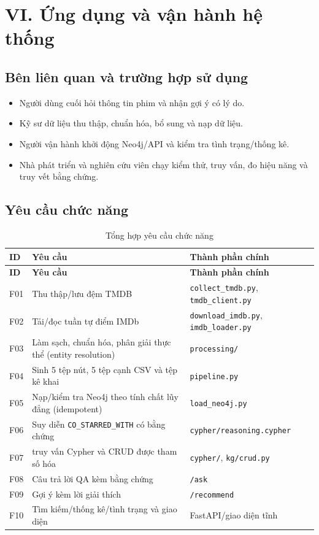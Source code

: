 \chapter{VI. Ứng dụng và vận hành hệ thống}

\section{Bên liên quan và trường hợp sử dụng}

\begin{itemize}
\item Người dùng cuối hỏi thông tin phim và nhận gợi ý có lý do.
\item Kỹ sư dữ liệu thu thập, chuẩn hóa, bổ sung và nạp dữ liệu.
\item Người vận hành khởi động Neo4j/API và kiểm tra tình trạng/thống kê.
\item Nhà phát triển và nghiên cứu viên chạy kiểm thử, truy vấn, đo hiệu năng và truy vết bằng chứng.
\end{itemize}

\section{Yêu cầu chức năng}

\begin{longtable}{|>{\raggedright\arraybackslash}p{}|>{\raggedright\arraybackslash}p{}|>{\raggedright\arraybackslash}p{}|}
\caption{Tổng hợp yêu cầu chức năng}\label{tab:6-1} \\
\hline
\textbf{ID} & \textbf{Yêu cầu} & \textbf{Thành phần chính} \\ \hline
\endfirsthead\hline \textbf{ID} & \textbf{Yêu cầu} & \textbf{Thành phần chính} \\ \hline\endhead
F01 & Thu thập/lưu đệm TMDB & \texttt{collect\_tmdb.py}, \texttt{tmdb\_client.py} \\ \hline
F02 & Tải/đọc tuần tự điểm IMDb & \texttt{download\_imdb.py}, \texttt{imdb\_loader.py} \\ \hline
F03 & Làm sạch, chuẩn hóa, phân giải thực thể (entity resolution) & \texttt{processing/} \\ \hline
F04 & Sinh 5 tệp nút, 5 tệp cạnh CSV và tệp kê khai & \texttt{pipeline.py} \\ \hline
F05 & Nạp/kiểm tra Neo4j theo tính chất lũy đẳng (idempotent) & \texttt{load\_neo4j.py} \\ \hline
F06 & Suy diễn \texttt{CO\_STARRED\_WITH} có bằng chứng & \texttt{cypher/reasoning.cypher} \\ \hline
F07 & 10 truy vấn Cypher và CRUD được tham số hóa & \texttt{cypher/}, \texttt{kg/crud.py} \\ \hline
F08 & Câu trả lời QA kèm bằng chứng & \texttt{/ask} \\ \hline
F09 & Gợi ý kèm lời giải thích & \texttt{/recommend} \\ \hline
F10 & Tìm kiếm/thống kê/tình trạng và giao diện & FastAPI/giao diện tĩnh \\ \hline
\end{longtable}

